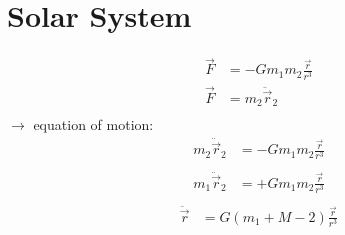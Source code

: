 \documentclass[11pt,a4paper]{article}
\begin{document}
\section{Solar System}
\begin{align*}
    \vec F &= -Gm_1m_2 \frac {\vec r } {r^3} \\ 
\vec F &= m_2  \ddot \vec r_2 \\
\end{align*}
$\rightarrow$ equation of motion: 
\begin{align*}
    m_2  \ddot \vec r_2 &= -Gm_1m_2 \frac {\vec r } {r^3} \\
\end{align*}
\begin{align*}
    m_1  \ddot \vec r_2 &= +Gm_1m_2 \frac {\vec r } {r^3} \\
\end{align*}
\begin{align*}
    \ddot \vec r &= G(m_1 + M-2) \frac {\vec r } {r^3}
\end{align*}
\end{document}
